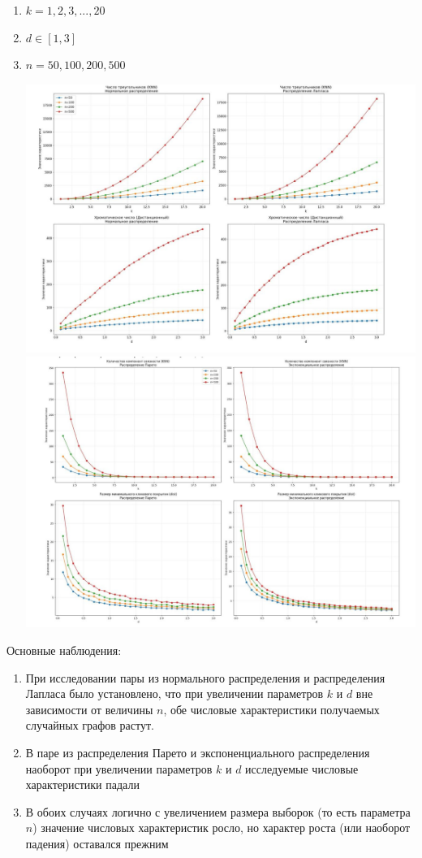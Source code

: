 \documentclass[a4paper,12pt]{article}
\begin{document}
\begin{enumerate}
    \item $k = 1, 2, 3, ..., 20$
    \item $d \in [1, 3]$
    \item $n = 50, 100, 200, 500$
\begin{center}
    \includegraphics[width=1\textwidth]{images/diff_params_laplace_normal.png}
    \includegraphics[width=1\textwidth]{images/diff_params_pareto_exp.png}
\end{center}
\end{enumerate}


Основные наблюдения:
\begin{enumerate}
    \item При исследовании пары из нормального распределения и распределения Лапласа было установлено, что при увеличении параметров $k$ и $d$ вне зависимости от величины $n$, обе числовые характеристики получаемых случайных графов растут.

    \item В паре из распределения Парето и экспоненциального распределения наоборот при увеличении параметров $k$ и $d$ исследуемые числовые характеристики падали

    \item В обоих случаях логично с увеличением размера выборок (то есть параметра $n$) значение числовых характеристик росло, но характер роста (или наоборот падения) оставался прежним
\end{enumerate}
\end{document}
